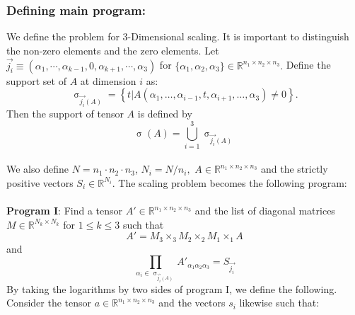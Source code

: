 \documentclass{article}
\begin{document}
\subsubsection{Defining main program:}
We define the problem for 3-Dimensional scaling. It is important to distinguish the non-zero elements and the zero elements. Let $\Vec{j_i}  \equiv (\alpha_1, \cdots, \alpha_{k-1}, 0, \alpha_{k+1}, \cdots, \alpha_3)$ for $\{\alpha_1, \alpha_2, \alpha_3\} \in \mathbb{R}^{n_1\times n_2\times n_3}.$ Define the support set of $A$ at dimension $i$ as: $$\upsigma_{\Vec{j_i}(A)} = \left\{ t| A(\alpha_1, \dots, \alpha_{i-1},t, \alpha_{i+1}, \dots, \alpha_3) \neq 0 \right\}.$$
Then the support of tensor $A$ is defined by 
$$\upsigma(A) = \bigcup\limits_{i=1}^{3} \upsigma_{\Vec{j_i}(A)}$$
\\
We also define $N = n_1\cdot n_2 \cdot n_3$, $N_i = N/n_i,$ $A \in \mathbb{R}^{n_1 \times n_2 \times n_3}$ and the strictly positive vectors $S_{i} \in \mathbb{R}^{N_i}$. The scaling problem becomes the following program:
\\
\\
\textbf{Program I}: Find a tensor $A' \in \mathbb{R}^{n_1 \times n_2 \times n_3}$ and the list of diagonal matrices $M\in \mathbb{R}^{N_k \times N_k}$ for $1\leq k \leq 3$ such that
\begin{equation}
    A' =  M_3\times_{3} M_{2} \times_{2} M_1 \times_{1} A
\end{equation}{}
and 
\begin{equation}
\prod_{\alpha_i \in \upsigma_{\Vec{j_i}(A)}} A'_{\alpha_1\alpha_2\alpha_3} = S_{\Vec{j_i}}  
\end{equation}
By taking the logarithms by two sides of program I, we define the following. Consider the tensor $a \in \mathbb{R}^{n_1\times n_2\times n_3}$ and the vectors $s_i$ likewise such that:
\end{document}
